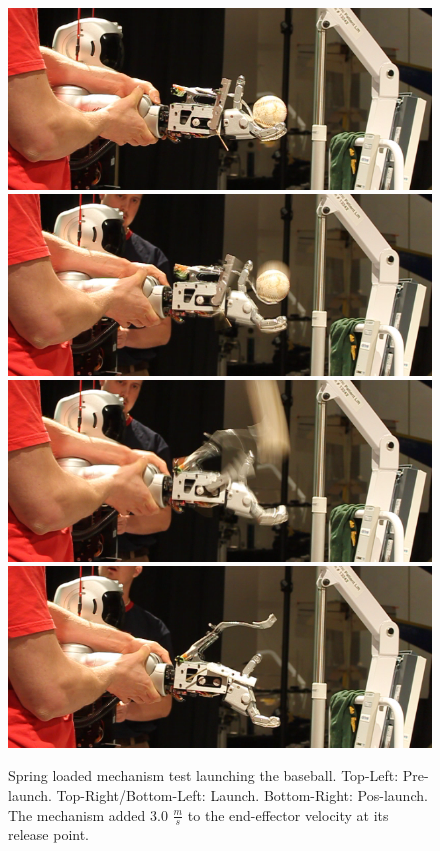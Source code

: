 \begin{figure}[t]
  \centering
\includegraphics[width=0.4\columnwidth]{./pix/arm0.png}\includegraphics[width=0.4\columnwidth]{./pix/arm1.png}
\includegraphics[width=0.4\columnwidth]{./pix/arm2.png}\includegraphics[width=0.4\columnwidth]{./pix/arm3.png}
  \caption{Spring loaded mechanism test launching the baseball.  Top-Left: Pre-launch.  Top-Right/Bottom-Left: Launch.  Bottom-Right: Pos-launch.  The mechanism added 3.0 $\frac{m}{s}$ to the end-effector velocity at its release point.}
  \label{fig:hubo-spring}
\end{figure}

